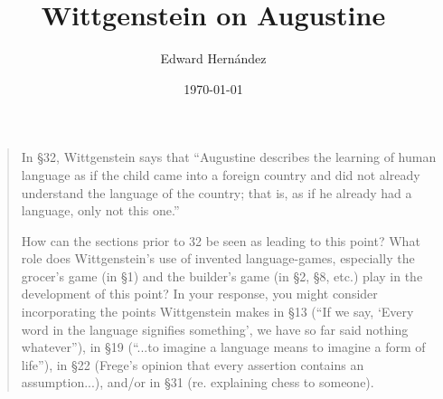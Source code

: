 \documentclass[doc,12pt,apacite,biblatex]{apa6}
\begin{document}
 \title{Wittgenstein on Augustine}
\author{Edward Hern\'{a}ndez}
\date{\today}

\maketitle

\vspace{-20pt}
\begin{quote}
	In \S 32, Wittgenstein says that ``Augustine describes the learning of
	human language as if the child came into a foreign country and did not
	already understand the language of the country; that is, as if he already
	had a language, only not this one.''

	How can the sections prior to 32 be seen as leading to this point?  What
	role does Wittgenstein's use of invented language-games, especially the
	grocer's game (in \S 1) and the builder's game (in \S 2, \S 8, etc.) play
	in the development of this point?   In your response, you might consider
	incorporating the points Wittgenstein makes in \S 13 (``If we say, `Every
	word in the language signifies something', we have so far said nothing
	whatever''), in \S 19 (``...to imagine a language means to imagine a form
	of life''), in \S 22 (Frege's opinion that every assertion contains an
	assumption...), and/or in \S 31 (re. explaining chess to someone).  
\end{quote}
\clearpage
\end{document}
